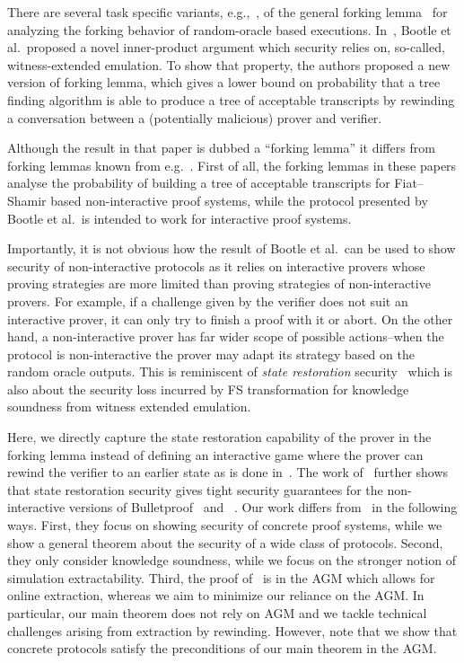 There are several task specific variants, e.g.,~\cite{INDOCRYPT:HerSae03,CCS:BagCheJar08,AC:BelDaiLi19}, of the general forking lemma~\cite{JC:PoiSte00,CCS:BelNev06} for analyzing the forking behavior of random-oracle based executions.
In~\cite{EC:BCCGP16}, Bootle et al.~proposed a novel inner-product argument which
security relies on, so-called, witness-extended emulation. To show that
property, the authors proposed a new version of forking lemma, which gives a
lower bound on probability that a tree finding algorithm is able to produce a 
tree of acceptable transcripts by rewinding a conversation between a
(potentially malicious) prover and verifier.

Although the result in that paper is dubbed a ``forking lemma'' it
differs from forking lemmas known from e.g.~\cite{JC:PoiSte00,CCS:BelNev06}.
First of all, the forking lemmas in these papers analyse the probability of building
a tree of acceptable transcripts for Fiat--Shamir based non-interactive proof
systems, while the protocol presented by Bootle et al.~is intended to work for
interactive proof systems.

Importantly, it is not obvious how the result of Bootle et al.~can be used to
show security of non-interactive protocols as it relies on interactive provers
whose proving strategies are more limited than proving strategies of
non-interactive provers. For example, if a challenge given by the verifier does not
suit an interactive prover, it can only try to finish a proof with it or
abort. On the other hand, a non-interactive prover has far wider scope of
possible actions--when the protocol is non-interactive the prover may
adapt its strategy based on the random oracle outputs. 
This is reminiscent of \emph{state restoration} security~\cite{TCC:BenChiSpo16,EPRINT:Holmgren19} which is also about the security loss incurred by FS transformation for knowledge soundness from witness extended emulation.

Here, we directly capture the state restoration capability of the prover in the forking lemma instead of defining an interactive game where the prover can rewind the verifier to an earlier state as is done in~\cite{C:GhoTes21}. 
The work of~\cite{C:GhoTes21} further shows that state restoration security gives tight security guarantees for the
non-interactive versions of Bulletproof~\cite{SP:BBBPWM18} and \sonic~. 
Our work differs from~\cite{C:GhoTes21} in the following ways. First, they
focus on showing security of concrete proof systems, while we show
a general theorem about the security of a wide class of protocols. 
Second, they only consider knowledge soundness, while we focus on the stronger notion of simulation extractability. Third, the proof of~\cite{C:GhoTes21} is in the AGM which allows for online extraction, whereas we aim to minimize our reliance on the AGM. In particular, our main theorem does not rely on AGM and we tackle technical challenges arising from extraction by rewinding. 
However, note that we show that concrete protocols satisfy the preconditions of our main theorem in the AGM.

 